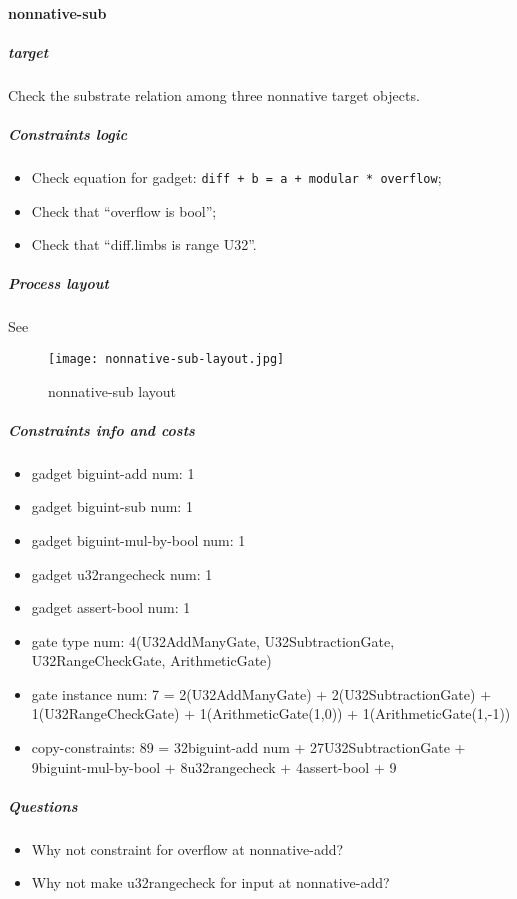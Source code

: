 \paragraph{nonnative-sub}

\subparagraph{target}
Check the substrate relation among three nonnative target objects.

\subparagraph{Constraints logic}
\begin{itemize}
    \item Check equation for gadget: \verb|diff + b = a + modular * overflow|;
    \item Check that ``overflow is bool'';
    \item Check that ``diff.limbs is range U32''.
\end{itemize}

\subparagraph{Process layout}
See 
\begin{figure}[!ht]
    \centering
    \texttt{[image: nonnative-sub-layout.jpg]}
    \caption{nonnative-sub layout}
    \label{fig:nonnative-sub-layout}
\end{figure}

\subparagraph{Constraints info and costs}
\begin{itemize}
    \item gadget biguint-add num: 1
    \item gadget biguint-sub num: 1
    \item gadget biguint-mul-by-bool num: 1
    \item gadget u32rangecheck num: 1
    \item gadget assert-bool num: 1
    \item gate type num: 4(U32AddManyGate, U32SubtractionGate, U32RangeCheckGate, ArithmeticGate)
    \item gate instance num: 7 = 2(U32AddManyGate) + 2(U32SubtractionGate) + 1(U32RangeCheckGate) + 1(ArithmeticGate(1,0)) + 1(ArithmeticGate(1,-1))
    \item copy-constraints: 89 = 32{biguint-add num} + 27{U32SubtractionGate} + 9{biguint-mul-by-bool} + 8{u32rangecheck} + 4{assert-bool} + 9
\end{itemize}

\subparagraph{Questions}
\begin{itemize}
    \item Why not constraint for overflow at nonnative-add?
    \item Why not make u32rangecheck for input at nonnative-add?
\end{itemize}
